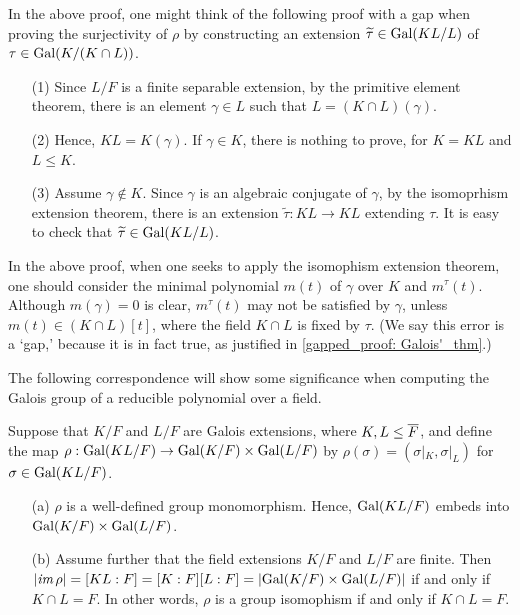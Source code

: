 \begin{rmk}
    In the above proof, one might think of the following proof with a gap when proving the surjectivity of $\rho$ by constructing an extension $\widetilde{\tau}\in{\textrm{Gal}({KL/L})}$ of $\tau\in{\textrm{Gal}({K/(K\cap L)})}$.
    
    \begin{enumerate}
        \item[(1)]
        {
            Since $L/F$ is a finite separable extension, by the primitive element theorem, there is an element $\gamma\in L$ such that $L=(K\cap L)(\gamma)$.
            }
        \item[(2)]
        {
            Hence, $KL=K(\gamma)$.
            If $\gamma\in K$, there is nothing to prove, for $K=KL$ and $L\leq K$.
        }
        \item[(3)]
        {
            Assume $\gamma\notin K$.
            \color{red}Since $\gamma$ is an algebraic conjugate of $\gamma$, by the isomoprhism extension theorem, there is an extension $\widetilde{\tau}: KL\rightarrow KL$ extending $\tau$. \color{black}
            It is easy to check that $\widetilde{\tau}\in{\textrm{Gal}({KL/L})}$.
        }
    \end{enumerate}
    In the above proof, when one seeks to apply the isomophism extension theorem, one should consider the minimal polynomial $m(t)$ of $\gamma$ over $K$ and $m^\tau(t)$.
    Although $m(\gamma)=0$ is clear, \color{red}$m^\tau(t)$ may not be satisfied by $\gamma$, unless $m(t)\in (K\cap L)[t]$\color{black}, where the field $K\cap L$ is fixed by $\tau$.
    (We say this error is a `gap,' because it is in fact true, as justified in \cref{gapped_proof: Galois'_thm}.)
\end{rmk}

The following correspondence will show some significance when computing the Galois group of a reducible polynomial over a field.
\begin{prop}
    Suppose that $K/F$ and $L/F$ are Galois extensions, where $K, L\leq\overline{F}$, and define the map $\rho: {\textrm{Gal}({KL/F})}\rightarrow{\textrm{Gal}({K/F})}\times{\textrm{Gal}({L/F})}$ by $\rho(\sigma)=(\sigma|_K, \sigma|_L)$ for $\sigma\in{\textrm{Gal}({KL/F})}$.
    \begin{enumerate}
        \item[(a)]
        {
            $\rho$ is a well-defined group monomorphism.    
            Hence, ${\textrm{Gal}({KL/F})}$ embeds into ${\textrm{Gal}({K/F})}\times{\textrm{Gal}({L/F})}$.
        }
        \item[(b)]
        {
            Assume further that the field extensions $K/F$ and $L/F$ are finite.
            Then $|\textit{im\,}\rho|=[KL:F]=[K:F][L:F]=|{\textrm{Gal}({K/F})}\times{\textrm{Gal}({L/F})}|$ if and only if $K\cap L=F$.
            In other words, $\rho$ is a group isomophism if and only if $K\cap L=F$.
        }
    \end{enumerate}
\end{prop}

